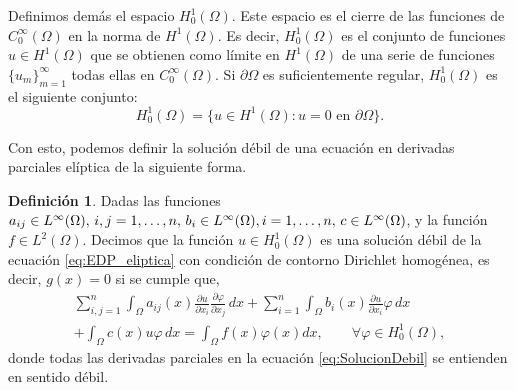 \documentclass[a4paper,11pt,spanish, twoside, leqno]{tfg-uam}
\theoremstyle{definition}
\newtheorem{defin}[teor]{Definici\'on}
\begin{document}
Definimos demás el espacio $H_0^1(\Omega)$. Este espacio es el cierre de las funciones de $C_0^\infty(\Omega)$ en la norma de $H^1(\Omega)$. Es decir, $H_0^1(\Omega)$ es el conjunto de funciones $u\in H^1(\Omega)$ que se obtienen como límite en $H^1(\Omega)$ de una serie de funciones $\{u_m\}_{m=1}^\infty$ todas ellas en $C_0^\infty(\Omega)$. Si $\partial\Omega$ es suficientemente regular, $H_0^1(\Omega)$ es el siguiente conjunto:
\begin{equation}
    H_0^1(\Omega)=\{u\in H^1(\Omega): u=0 \text{ en } \partial\Omega\}.
\end{equation}

Con esto, podemos definir la solución débil de una ecuación en derivadas parciales elíptica de la siguiente forma.
\begin{mdframed}
\begin{defin}\label{def:SolucionDebil}
    Dadas las funciones $a_{ij} \in L^\infty(\Omega), \, i,j = 1,\dots, n, \, b_i \in L^\infty(\Omega), \\i= 1, \dots, n, \, c\in L^\infty(\Omega)$, y la función $f\in L^2(\Omega)$. Decimos que la función $u\in H^1_0(\Omega)$ es una solución débil de la ecuación \eqref{eq:EDP_eliptica} con condición de contorno Dirichlet homogénea, es decir, $g(x)=0$ si se cumple que, 
    \begin{equation}\label{eq:SolucionDebil}
        \begin{aligned}
            \sum_{i,j=1}^{n} \int_\Omega a_{ij}(x) \frac{\partial u}{\partial x_i} \frac{\partial \varphi}{\partial x_j}\,dx + \sum_{i=1}^{n} \int_\Omega b_i(x)\frac{\partial u}{\partial x_i} \varphi \,dx  \\+ \int_\Omega c(x)u \varphi \,dx = \int_\Omega f(x)\varphi(x) dx, \qquad \forall \varphi \in H^1_0(\Omega),
        \end{aligned}
    \end{equation}
    donde todas las derivadas parciales en la ecuación \eqref{eq:SolucionDebil} se entienden en sentido débil.
\end{defin}
\end{mdframed}
\end{document}
